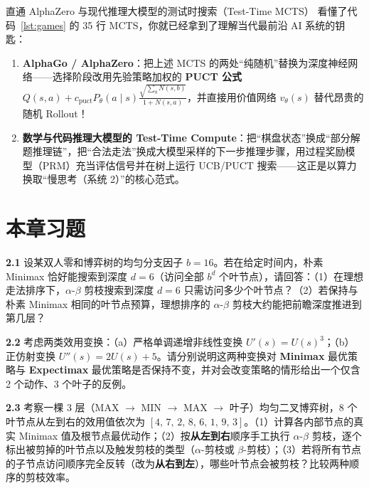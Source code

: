 \begin{insightBox}{直通 AlphaZero 与现代推理大模型的测试时搜索（Test-Time MCTS）}
看懂了代码~\ref{lst:games} 的 35 行 MCTS，你就已经拿到了理解当代最前沿 AI 系统的钥匙：
\begin{enumerate}
  \item \textbf{AlphaGo / AlphaZero}：把上述 MCTS 的两处“纯随机”替换为深度神经网络——选择阶段改用先验策略加权的 \textbf{PUCT 公式} $Q(s,a) + c_{\text{puct}} P_\theta(a\mid s)\frac{\sqrt{\sum_b N(s,b)}}{1+N(s,a)}$，并直接用价值网络 $v_\theta(s)$ 替代昂贵的随机 Rollout！
  \item \textbf{数学与代码推理大模型的 Test-Time Compute}：把“棋盘状态”换成“部分解题推理链”，把“合法走法”换成大模型采样的下一步推理步骤，用过程奖励模型（PRM）充当评估信号并在树上运行 UCB/PUCT 搜索——这正是以算力换取“慢思考（系统 2）”的核心范式。
\end{enumerate}
\end{insightBox}

\section{本章习题}\label{sec:ch2-ex}


\textbf{2.1} \quad 设某双人零和博弈树的均匀分支因子 $b=16$。若在给定时间内，朴素 Minimax 恰好能搜索到深度 $d=6$（访问全部 $b^d$ 个叶节点），请回答：（1）在理想走法排序下，$\alpha$-$\beta$ 剪枝搜索到深度 $d=6$ 只需访问多少个叶节点？（2）若保持与朴素 Minimax 相同的叶节点预算，理想排序的 $\alpha$-$\beta$ 剪枝大约能把前瞻深度推进到第几层？

\textbf{2.2} \quad 考虑两类效用变换：（a）严格单调递增非线性变换 $U'(s) = U(s)^3$；（b）正仿射变换 $U''(s) = 2 U(s) + 5$。请分别说明这两种变换对 \textbf{Minimax} 最优策略与 \textbf{Expectimax} 最优策略是否保持不变，并对会改变策略的情形给出一个仅含 2 个动作、3 个叶子的反例。


\textbf{2.3} \quad 考察一棵 3 层（MAX $\to$ MIN $\to$ MAX $\to$ 叶子）均匀二叉博弈树，8 个叶节点从左到右的效用值依次为 $[4,\, 7,\, 2,\, 8,\, 6,\, 1,\, 9,\, 3]$。（1）计算各内部节点的真实 Minimax 值及根节点最优动作；（2）按\textbf{从左到右}顺序手工执行 $\alpha$-$\beta$ 剪枝，逐个标出被剪掉的叶节点以及触发剪枝的类型（$\alpha$-剪枝或 $\beta$-剪枝）；（3）若将所有节点的子节点访问顺序完全反转（改为\textbf{从右到左}），哪些叶节点会被剪枝？比较两种顺序的剪枝效率。

